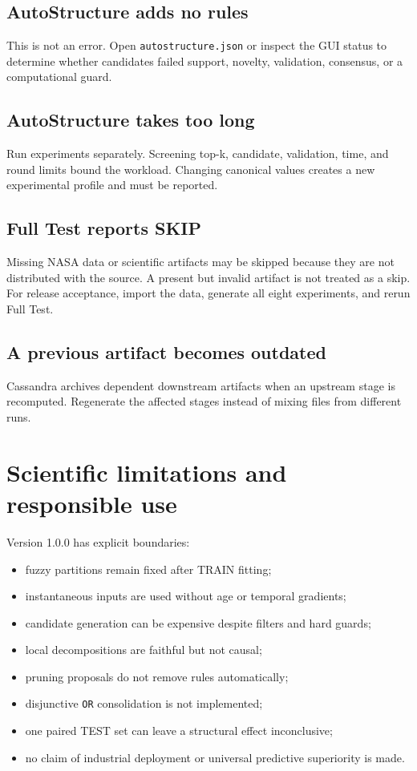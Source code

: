 \documentclass[11pt,a4paper]{article}
\begin{document}
\subsection*{AutoStructure adds no rules}

This is not an error. Open \texttt{autostructure.json} or inspect the GUI status
to determine whether candidates failed support, novelty, validation, consensus,
or a computational guard.

\subsection*{AutoStructure takes too long}

Run experiments separately. Screening top-k, candidate, validation, time, and
round limits bound the workload. Changing canonical values creates a new
experimental profile and must be reported.

\subsection*{Full Test reports SKIP}

Missing NASA data or scientific artifacts may be skipped because they are not
distributed with the source. A present but invalid artifact is not treated as a
skip. For release acceptance, import the data, generate all eight experiments,
and rerun Full Test.

\subsection*{A previous artifact becomes outdated}

Cassandra archives dependent downstream artifacts when an upstream stage is
recomputed. Regenerate the affected stages instead of mixing files from
different runs.

\section{Scientific limitations and responsible use}

Version 1.0.0 has explicit boundaries:

\begin{itemize}
  \item fuzzy partitions remain fixed after TRAIN fitting;
  \item instantaneous inputs are used without age or temporal gradients;
  \item candidate generation can be expensive despite filters and hard guards;
  \item local decompositions are faithful but not causal;
  \item pruning proposals do not remove rules automatically;
  \item disjunctive \texttt{OR} consolidation is not implemented;
  \item one paired TEST set can leave a structural effect inconclusive;
  \item no claim of industrial deployment or universal predictive superiority is made.
\end{itemize}
\end{document}
